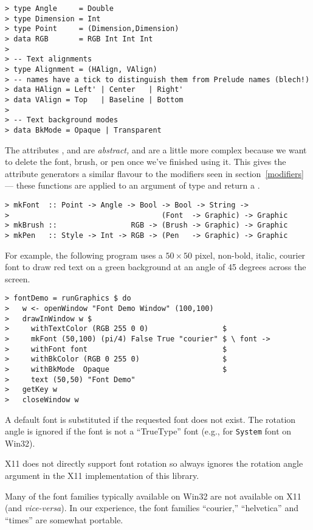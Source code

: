 \begin{verbatim}
> type Angle     = Double
> type Dimension = Int
> type Point     = (Dimension,Dimension)
> data RGB       = RGB Int Int Int
> 
> -- Text alignments
> type Alignment = (HAlign, VAlign)
> -- names have a tick to distinguish them from Prelude names (blech!)
> data HAlign = Left' | Center   | Right'
> data VAlign = Top   | Baseline | Bottom
> 
> -- Text background modes
> data BkMode = Opaque | Transparent
\end{verbatim}

The attributes ,  and  are
{\em abstract,\/} and are a little more complex because we want to 
delete the font, brush, or pen once we've finished using it.  This
gives the attribute generators a similar flavour to the modifiers seen
in section~\ref{modifiers} --- these functions are applied to an
argument of type  and return a
.

%
\begin{verbatim}
> mkFont  :: Point -> Angle -> Bool -> Bool -> String -> 
>                                   (Font  -> Graphic) -> Graphic
> mkBrush ::                 RGB -> (Brush -> Graphic) -> Graphic
> mkPen   :: Style -> Int -> RGB -> (Pen   -> Graphic) -> Graphic
\end{verbatim}

For example, the following program uses a $50 \times 50$ pixel, non-bold,
italic, courier font to draw red text on a green background at an angle
of 45 degrees across the screen.

\begin{verbatim}
> fontDemo = runGraphics $ do
>   w <- openWindow "Font Demo Window" (100,100)
>   drawInWindow w $
>     withTextColor (RGB 255 0 0)                 $
>     mkFont (50,100) (pi/4) False True "courier" $ \ font ->
>     withFont font                               $
>     withBkColor (RGB 0 255 0)                   $
>     withBkMode  Opaque                          $
>     text (50,50) "Font Demo"
>   getKey w
>   closeWindow w
\end{verbatim}

A default font is substituted if the requested font does not exist.
The rotation angle is ignored if the font is not a ``TrueType'' font
(e.g., for {\tt System} font on Win32).

\begin{portability}
\item X11 does not directly support font rotation so 
always ignores the rotation angle argument in the X11 implementation
of this library.

\item Many of the font families typically available on Win32 are not
available on X11 (and {\it vice-versa\/}).  In our experience, the
font families ``courier,'' ``helvetica'' and ``times'' are somewhat
portable.

\end{portability}



